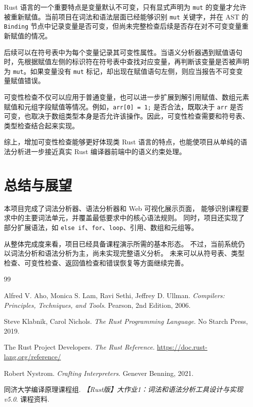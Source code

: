 \documentclass[UTF8,a4paper,12pt]{ctexart}
\begin{document}
Rust 语言的一个重要特点是变量默认不可变，只有显式声明为 \texttt{mut} 的变量才允许被重新赋值。当前项目在词法和语法层面已经能够识别 \texttt{mut} 关键字，并在 AST 的 \texttt{Binding} 节点中记录变量是否可变，但尚未完整检查后续是否存在对不可变变量重新赋值的情况。

后续可以在符号表中为每个变量记录其可变性属性。当语义分析器遇到赋值语句时，先根据赋值左侧的标识符在符号表中查找对应变量，再判断该变量是否被声明为 \texttt{mut}。如果变量没有 \texttt{mut} 标记，却出现在赋值语句左侧，则应当报告不可变变量赋值错误。

可变性检查不仅可以应用于普通变量，也可以进一步扩展到解引用赋值、数组元素赋值和元组字段赋值等情况。例如，\texttt{arr[0] = 1;} 是否合法，既取决于 \texttt{arr} 是否可变，也取决于数组类型本身是否允许该操作。因此，可变性检查需要和符号表、类型检查结合起来实现。

综上，增加可变性检查能够更好体现类 Rust 语言的特点，也能使项目从单纯的语法分析进一步接近真实 Rust 编译器前端中的语义约束处理。

\section{总结与展望}

本项目完成了词法分析器、语法分析器和 Web 可视化展示页面，
能够识别课程要求中的主要词法单元，并覆盖最低要求中的核心语法规则。
同时，项目还实现了部分扩展语法，如 \texttt{else if}、\texttt{for}、\texttt{loop}、引用、数组和元组等。

从整体完成度来看，项目已经具备课程演示所需的基本形态。
不过，当前系统仍以词法分析和语法分析为主，尚未实现完整语义分析。
未来可以从符号表、类型检查、可变性检查、返回值检查和错误恢复等方面继续完善。

\newpage

\begin{thebibliography}{99}

Alfred V. Aho, Monica S. Lam, Ravi Sethi, Jeffrey D. Ullman.
\newblock \textit{Compilers: Principles, Techniques, and Tools}.
\newblock Pearson, 2nd Edition, 2006.

Steve Klabnik, Carol Nichols.
\newblock \textit{The Rust Programming Language}.
\newblock No Starch Press, 2019.

The Rust Project Developers.
\newblock \textit{The Rust Reference}.
\newblock \url{https://doc.rust-lang.org/reference/}

Robert Nystrom.
\newblock \textit{Crafting Interpreters}.
\newblock Genever Benning, 2021.

同济大学编译原理课程组.
\newblock \textit{【Rust版】大作业1：词法和语法分析工具设计与实现v5.0}.
\newblock 课程资料.

\end{thebibliography}
\end{document}
